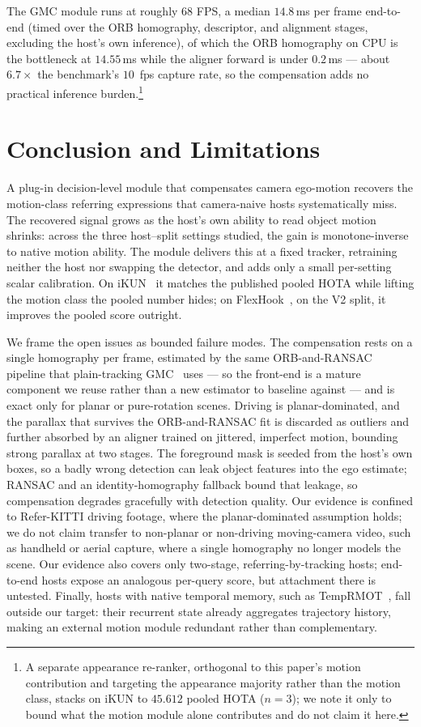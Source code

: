 \documentclass[sigconf,review,anonymous]{acmart}
\begin{document}
The GMC module runs at roughly $68$ FPS, a median $14.8$\,ms per frame end-to-end (timed over the ORB homography, descriptor, and alignment stages, excluding the host's own inference), of which the ORB homography on CPU is the bottleneck at $14.55$\,ms while the aligner forward is under $0.2$\,ms --- about $6.7\times$ the benchmark's $10$~fps capture rate, so the compensation adds no practical inference burden.\footnote{A separate appearance re-ranker, orthogonal to this paper's motion contribution and targeting the appearance majority rather than the motion class, stacks on iKUN to $45.612$ pooled HOTA ($n{=}3$); we note it only to bound what the motion module alone contributes and do not claim it here.}

\section{Conclusion and Limitations}
\label{sec:conclusion}
A plug-in decision-level module that compensates camera ego-motion recovers the motion-class referring expressions that camera-naive hosts systematically miss. The recovered signal grows as the host's own ability to read object motion shrinks: across the three host--split settings studied, the gain is monotone-inverse to native motion ability. The module delivers this at a fixed tracker, retraining neither the host nor swapping the detector, and adds only a small per-setting scalar calibration. On iKUN~\cite{ikun} it matches the published pooled HOTA while lifting the motion class the pooled number hides; on FlexHook~\cite{flexhook}, on the V2 split, it improves the pooled score outright.

We frame the open issues as bounded failure modes. The compensation rests on a single homography per frame, estimated by the same ORB-and-RANSAC pipeline that plain-tracking GMC~\cite{botsort} uses --- so the front-end is a mature component we reuse rather than a new estimator to baseline against --- and is exact only for planar or pure-rotation scenes. Driving is planar-dominated, and the parallax that survives the ORB-and-RANSAC fit is discarded as outliers and further absorbed by an aligner trained on jittered, imperfect motion, bounding strong parallax at two stages. The foreground mask is seeded from the host's own boxes, so a badly wrong detection can leak object features into the ego estimate; RANSAC and an identity-homography fallback bound that leakage, so compensation degrades gracefully with detection quality. Our evidence is confined to Refer-KITTI driving footage, where the planar-dominated assumption holds; we do not claim transfer to non-planar or non-driving moving-camera video, such as handheld or aerial capture, where a single homography no longer models the scene. Our evidence also covers only two-stage, referring-by-tracking hosts; end-to-end hosts expose an analogous per-query score, but attachment there is untested. Finally, hosts with native temporal memory, such as TempRMOT~\cite{temprmot}, fall outside our target: their recurrent state already aggregates trajectory history, making an external motion module redundant rather than complementary.
\end{document}
